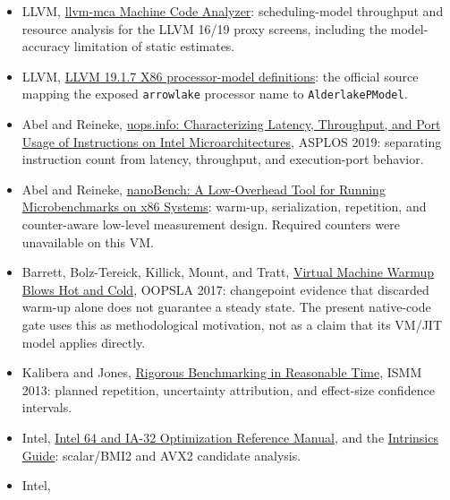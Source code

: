 \documentclass[11pt,a4paper]{article}
\begin{document}
{\begin{itemize}
    \href{https://people.csail.mit.edu/asolar/papers/asplos06-final.pdf}
    {Combinatorial Sketching for Finite Programs}, ASPLOS 2006: the CEGIS-style
    template-and-counterexample synthesis procedure.
  \item LLVM,
    \href{https://llvm.org/docs/CommandGuide/llvm-mca.html}
    {llvm-mca Machine Code Analyzer}: scheduling-model throughput and resource
    analysis for the LLVM 16/19 proxy screens, including the model-accuracy
    limitation of static estimates.
  \item LLVM,
    \href{https://github.com/llvm/llvm-project/blob/llvmorg-19.1.7/llvm/lib/Target/X86/X86.td}
    {LLVM 19.1.7 X86 processor-model definitions}: the official source mapping
    the exposed \texttt{arrowlake} processor name to
    \texttt{AlderlakePModel}.
  \item Abel and Reineke,
    \href{https://arxiv.org/abs/1810.04610}
    {uops.info: Characterizing Latency, Throughput, and Port Usage of
    Instructions on Intel Microarchitectures}, ASPLOS 2019: separating
    instruction count from latency, throughput, and execution-port behavior.
  \item Abel and Reineke,
    \href{https://arxiv.org/abs/1911.03282}
    {nanoBench: A Low-Overhead Tool for Running Microbenchmarks on x86
    Systems}: warm-up, serialization, repetition, and counter-aware low-level
    measurement design.  Required counters were unavailable on this VM.
  \item Barrett, Bolz-Tereick, Killick, Mount, and Tratt,
    \href{https://arxiv.org/abs/1602.00602}
    {Virtual Machine Warmup Blows Hot and Cold}, OOPSLA 2017: changepoint
    evidence that discarded warm-up alone does not guarantee a steady state.
    The present native-code gate uses this as methodological motivation, not as
    a claim that its VM/JIT model applies directly.
  \item Kalibera and Jones,
    \href{https://doi.org/10.1145/2464157.2464160}
    {Rigorous Benchmarking in Reasonable Time}, ISMM 2013: planned repetition,
    uncertainty attribution, and effect-size confidence intervals.
  \item Intel,
    \href{https://www.intel.com/content/www/us/en/developer/articles/technical/intel64-and-ia32-architectures-optimization.html}
    {Intel 64 and IA-32 Optimization Reference Manual}, and the
    \href{https://www.intel.com/content/www/us/en/docs/intrinsics-guide/index.html}
    {Intrinsics Guide}: scalar/BMI2 and AVX2 candidate analysis.
  \item Intel,

\end{itemize}}
\end{document}
